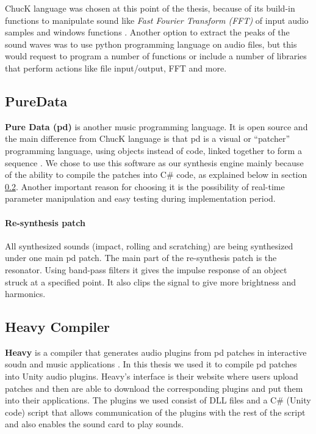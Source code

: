 ChucK language was chosen at this point of the thesis, because of its build-in functions to manipulate sound like \textit{Fast Fourier Transform (FFT)} of input audio samples and windows functions \cite{bib:chuck_doc}. Another option to extract the peaks of the sound waves was to use python programming language on audio files, but this would request to program a number of functions or include a number of libraries that perform actions like file input/output, FFT and more. 

 
\subsection{PureData}
\textbf{Pure Data (pd)} is another music programming language. It is open source and the main difference from ChucK language is that pd is a visual or ``patcher'' programming language, using objects instead of code, linked together to form a sequence \cite{bib:pd}. We chose to use this software as our synthesis engine mainly because of the ability to compile the patches into C\# code, as explained below in section \ref{sec:heavy}. Another important reason for choosing it is the possibility of real-time parameter manipulation and easy testing during implementation period.

\paragraph{Re-synthesis patch\\}
All synthesized sounds (impact, rolling and scratching) are being synthesized under one main pd patch. The main part of the re-synthesis patch is the resonator. Using band-pass filters it gives the impulse response of an object struck at a specified point. It also clips the signal to give more brightness and harmonics. 


\subsection{Heavy Compiler}\label{sec:heavy}
\textbf{Heavy} is a compiler that generates audio plugins from pd patches in interactive soudn and music applications \cite{bib:heavy}. In this thesis we used it to compile pd patches into Unity\textsuperscript{\textregistered} audio plugins. Heavy's interface is their website where users upload patches and then are able to download the corresponding plugins and put them into their applications. The plugins we used consist of DLL files and a C\# (Unity\textsuperscript{\textregistered} code) script that allows communication of the plugins with the rest of the script and also enables the sound card to play sounds.

